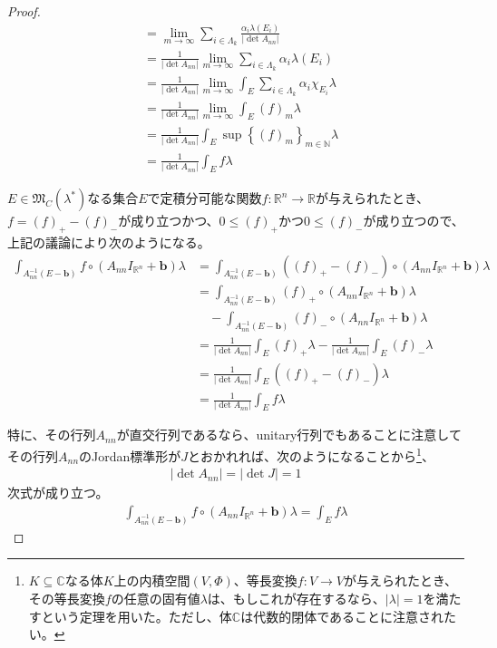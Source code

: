 \documentclass[dvipdfmx]{jsarticle}
\begin{document}
\begin{proof}
\begin{align*}
&= \lim_{m \rightarrow \infty}{\sum_{i \in \varLambda_{k}} \frac{\alpha_{i}\lambda\left( E_{i} \right)}{\left| \det A_{nn} \right|}}\\
&= \frac{1}{\left| \det A_{nn} \right|}\lim_{m \rightarrow \infty}{\sum_{i \in \varLambda_{k}} {\alpha_{i}\lambda\left( E_{i} \right)}}\\
&= \frac{1}{\left| \det A_{nn} \right|}\lim_{m \rightarrow \infty}{\int_{E} {\sum_{i \in \varLambda_{k}} {\alpha_{i}\chi_{E_{i}}}\lambda}}\\
&= \frac{1}{\left| \det A_{nn} \right|}\lim_{m \rightarrow \infty}{\int_{E} {(f)_{m}\lambda}}\\
&= \frac{1}{\left| \det A_{nn} \right|}\int_{E} {\sup\left\{ (f)_{m} \right\}_{m \in \mathbb{N}}\lambda}\\
&= \frac{1}{\left| \det A_{nn} \right|}\int_{E} {f\lambda}
\end{align*}\par
$E \in \mathfrak{M}_{C}\left( \lambda^{*} \right)$なる集合$E$で定積分可能な関数$f:\mathbb{R}^{n} \rightarrow \mathbb{R}$が与えられたとき、$f = (f)_{+} - (f)_{-}$が成り立つかつ、$0 \leq (f)_{+}$かつ$0 \leq (f)_{-}$が成り立つので、上記の議論により次のようになる。
\begin{align*}
\int_{A_{nn}^{- 1}\left( E - \mathbf{b} \right)} {f \circ \left( A_{nn}I_{\mathbb{R}^{n}} + \mathbf{b} \right)\lambda} &= \int_{A_{nn}^{- 1}\left( E - \mathbf{b} \right)} {\left( (f)_{+} - (f)_{-} \right) \circ \left( A_{nn}I_{\mathbb{R}^{n}} + \mathbf{b} \right)\lambda}\\
&= \int_{A_{nn}^{- 1}\left( E - \mathbf{b} \right)} {(f)_{+} \circ \left( A_{nn}I_{\mathbb{R}^{n}} + \mathbf{b} \right)\lambda} \\
&\quad - \int_{A_{nn}^{- 1}\left( E - \mathbf{b} \right)} {(f)_{-} \circ \left( A_{nn}I_{\mathbb{R}^{n}} + \mathbf{b} \right)\lambda}\\
&= \frac{1}{\left| \det A_{nn} \right|}\int_{E} {(f)_{+}\lambda} - \frac{1}{\left| \det A_{nn} \right|}\int_{E} {(f)_{-}\lambda}\\
&= \frac{1}{\left| \det A_{nn} \right|}\int_{E} {\left( (f)_{+} - (f)_{-} \right)\lambda}\\
&= \frac{1}{\left| \det A_{nn} \right|}\int_{E} {f\lambda}
\end{align*}\par
特に、その行列$A_{nn}$が直交行列であるなら、unitary行列でもあることに注意してその行列$A_{nn}$のJordan標準形が$J$とおかれれば、次のようになることから\footnote{$K \subseteq \mathbb{C}$なる体$K$上の内積空間$(V,\varPhi)$、等長変換$f:V \rightarrow V$が与えられたとき、その等長変換$f$の任意の固有値$\lambda$は、もしこれが存在するなら、$|\lambda| = 1$を満たすという定理を用いた。ただし、体$\mathbb{C}$は代数的閉体であることに注意されたい。}、
\begin{align*}
\left| \det A_{nn} \right| = \left| \det J \right| = 1
\end{align*}
次式が成り立つ。
\begin{align*}
\int_{A_{nn}^{- 1}\left( E - \mathbf{b} \right)} {f \circ \left( A_{nn}I_{\mathbb{R}^{n}} + \mathbf{b} \right)\lambda} = \int_{E} {f\lambda}
\end{align*}
\end{proof}
\end{document}
